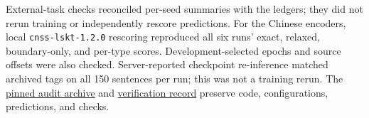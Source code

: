 External-task checks reconciled per-seed summaries with the ledgers; they did not rerun training or independently rescore predictions. For the Chinese encoders, local \texttt{cnss-lskt-1.2.0} rescoring reproduced all six runs' exact, relaxed, boundary-only, and per-type scores. Development-selected epochs and source offsets were also checked. Server-reported checkpoint re-inference matched archived tags on all 150 sentences per run; this was not a training rerun. The \href{https://github.com/AlfredJamesLi/chinese-skillspan-benchmark/tree/0c73207c0f9b00fa87f385b78bcb7342bd00bfcb/results_snapshots/table11_evidence_20260924}{pinned audit archive} and \href{https://github.com/AlfredJamesLi/chinese-skillspan-benchmark/blob/main/reproduction/evidence_review_20260925/README.md}{verification record} preserve code, configurations, predictions, and checks.


\FloatBarrier

\FloatBarrier
